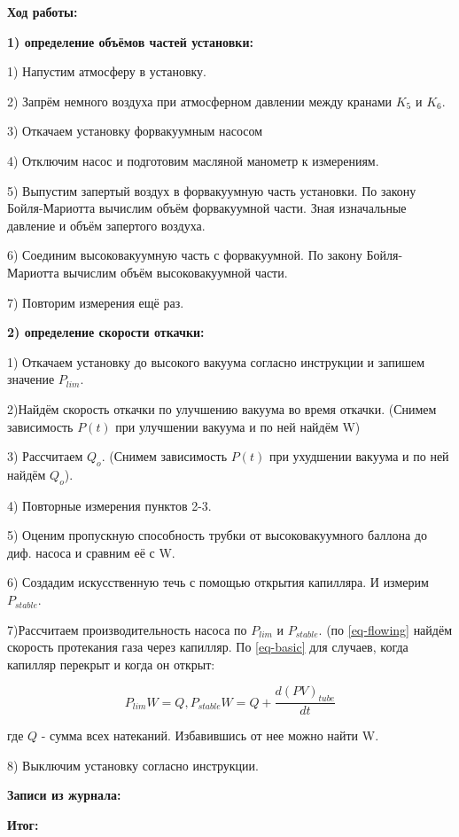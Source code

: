 \documentclass[a4paper,12pt]{article}
\begin{document}
\textbf{Ход работы:}
\bigskip

\textbf{1) определение объёмов частей установки:}

1) Напустим атмосферу в установку.

2) Запрём немного воздуха при атмосферном давлении между кранами $K_5$ и $K_6$.

3) Откачаем установку форвакуумным насосом

4) Отключим насос и подготовим масляной манометр к измерениям.

5) Выпустим запертый воздух в форвакуумную часть установки. По закону Бойля-Мариотта вычислим объём форвакуумной части. Зная изначальные давление и объём запертого воздуха.

6) Соединим высоковакуумную часть с форвакуумной. По закону Бойля-Мариотта вычислим объём высоковакуумной части.

7) Повторим измерения ещё раз.

\textbf{2) определение скорости откачки:}

1) Откачаем установку до высокого вакуума согласно инструкции и запишем значение $P_{lim}$.

2)Найдём скорость откачки по улучшению вакуума во время откачки. (Снимем зависимость $P(t)$ при улучшении вакуума и по ней найдём W)

3) Рассчитаем $Q_o$. (Снимем зависимость $P(t)$ при ухудшении вакуума и по ней найдём $Q_o$).

4) Повторные измерения пунктов 2-3.

5) Оценим пропускную способность трубки от высоковакуумного баллона до диф. насоса и сравним её с W.

6) Создадим искусственную течь с помощью открытия капилляра. И измерим $P_{stable}$.

7)Рассчитаем производительность насоса по $P_{lim}$ и $P_{stable}$. (по \ref{eq-flowing} найдём скорость протекания газа через капилляр. По \ref{eq-basic} для случаев, когда капилляр перекрыт и когда он открыт:

\[P_{lim} W = Q,    P_{stable} W = Q + \frac{d(PV)_{tube}}{dt}\]

где $Q$ - сумма всех натеканий. Избавившись от нее можно найти W.

8) Выключим установку согласно инструкции.

\bigskip

\textbf{Записи из журнала:}
\bigskip


\bigskip

\textbf{Итог:}
\bigskip
 
\end{document}
